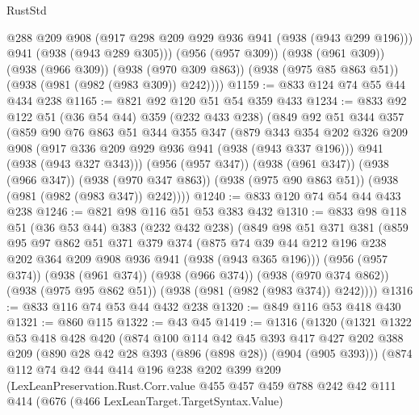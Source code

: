 \begin{lexlean}{RustStd}
\begin{coremodule}
          @288
          @209
          @908
          (@917 @298 @209 @929 @936 @941 (@938 (@943 @299 @196)))
          @941
          (@938 (@943 @289 @305)))
        (@956 (@957 @309))
        (@938 (@961 @309))
        (@938 (@966 @309))
        (@938 (@970 @309 @863))
        (@938 (@975 @85 @863 @51))
        (@938 (@981 (@982 (@983 @309)) @242))))
@1159 := @833 @124 @74 @55 @44 @434 @238
@1165 := @821 @92 @120 @51 @54 @359 @433
@1234 := @833
    @92
    @122
    @51
    (@36 @54 @44)
    @359
    (@232 @433 @238)
    (@849
      @92
      @51
      @344
      @357
      (@859
        @90
        @76
        @863
        @51
        @344
        @355
        @347
        (@879
          @343
          @354
          @202
          @326
          @209
          @908
          (@917 @336 @209 @929 @936 @941 (@938 (@943 @337 @196)))
          @941
          (@938 (@943 @327 @343)))
        (@956 (@957 @347))
        (@938 (@961 @347))
        (@938 (@966 @347))
        (@938 (@970 @347 @863))
        (@938 (@975 @90 @863 @51))
        (@938 (@981 (@982 (@983 @347)) @242))))
@1240 := @833 @120 @74 @54 @44 @433 @238
@1246 := @821 @98 @116 @51 @53 @383 @432
@1310 := @833
    @98
    @118
    @51
    (@36 @53 @44)
    @383
    (@232 @432 @238)
    (@849
      @98
      @51
      @371
      @381
      (@859
        @95
        @97
        @862
        @51
        @371
        @379
        @374
        (@875 @74 @39 @44 @212 @196 @238 @202 @364 @209 @908 @936 @941 (@938 (@943 @365 @196)))
        (@956 (@957 @374))
        (@938 (@961 @374))
        (@938 (@966 @374))
        (@938 (@970 @374 @862))
        (@938 (@975 @95 @862 @51))
        (@938 (@981 (@982 (@983 @374)) @242))))
@1316 := @833 @116 @74 @53 @44 @432 @238
@1320 := @849 @116 @53 @418 @430
@1321 := @860 @115
@1322 := @43 @45
@1419 := @1316
    (@1320
      (@1321
        @1322
        @53
        @418
        @428
        @420
        (@874
          @100
          @114
          @42
          @45
          @393
          @417
          @427
          @202
          @388
          @209
          (@890 @28 @42 @28 @393 (@896 (@898 @28)) (@904 (@905 @393)))
          (@874
            @112
            @74
            @42
            @44
            @414
            @196
            @238
            @202
            @399
            @209
            (LexLeanPreservation.Rust.Corr.value
              @455
              @457
              @459
              @788
              @242
              @42
              @111
              @414
              (@676
                (@466 LexLeanTarget.TargetSyntax.Value)

\end{coremodule}
\end{lexlean}
